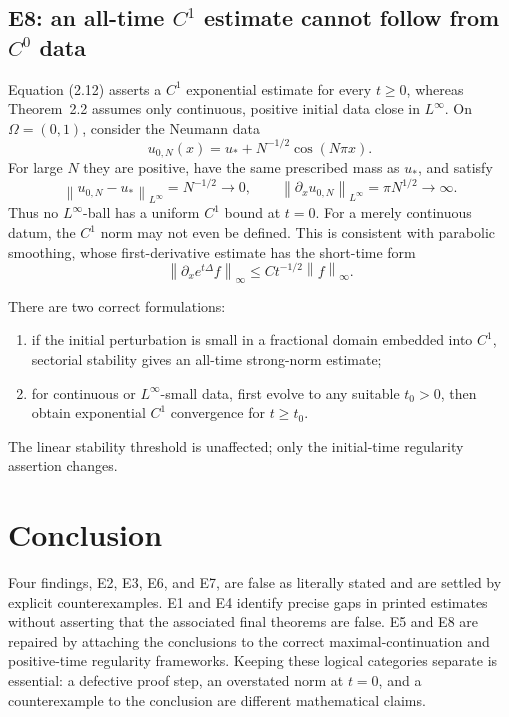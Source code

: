 \documentclass[11pt]{article}
\newcommand{\Om}{\Omega}
\newcommand{\norm}[1]{\left\lVert #1\right\rVert}
\begin{document}
\subsection{E8: an all-time \(C^1\) estimate cannot follow from \(C^0\) data}

Equation (2.12) asserts a \(C^1\) exponential estimate for every \(t\ge0\),
whereas Theorem~2.2 assumes only continuous, positive initial data close in
\(L^\infty\).  On \(\Om=(0,1)\), consider the Neumann data
\[
 u_{0,N}(x)=u_*+N^{-1/2}\cos(N\pi x).
\]
For large \(N\) they are positive, have the same prescribed mass as \(u_*\),
and satisfy
\[
 \norm{u_{0,N}-u_*}_{L^\infty}=N^{-1/2}\to0,
 \qquad
 \norm{\partial_xu_{0,N}}_{L^\infty}=\pi N^{1/2}\to\infty.
\]
Thus no \(L^\infty\)-ball has a uniform \(C^1\) bound at \(t=0\).  For a
merely continuous datum, the \(C^1\) norm may not even be defined.  This is
consistent with parabolic smoothing, whose first-derivative estimate has the
short-time form
\[
 \norm{\partial_x e^{t\Delta}f}_\infty
 \le Ct^{-1/2}\norm f_\infty.
\]

There are two correct formulations:
\begin{enumerate}[leftmargin=2em]
\item if the initial perturbation is small in a fractional domain embedded
  into \(C^1\), sectorial stability gives an all-time strong-norm estimate;
\item for continuous or \(L^\infty\)-small data, first evolve to any suitable
  \(t_0>0\), then obtain exponential \(C^1\) convergence for \(t\ge t_0\).
\end{enumerate}
The linear stability threshold is unaffected; only the initial-time
regularity assertion changes.

\section{Conclusion}

Four findings, E2, E3, E6, and E7, are false as literally stated and are
settled by explicit counterexamples.  E1 and E4 identify precise gaps in
printed estimates without asserting that the associated final theorems are
false.  E5 and E8 are repaired by attaching the conclusions to the correct
maximal-continuation and positive-time regularity frameworks.  Keeping these
logical categories separate is essential: a defective proof step, an
overstated norm at \(t=0\), and a counterexample to the conclusion are
different mathematical claims.
\end{document}
